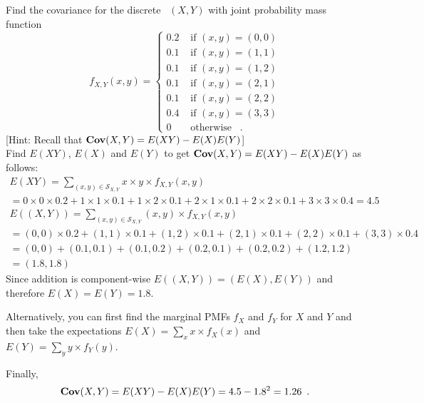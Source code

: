 \begin{ExerciseList}
\Exercise
Find the covariance for the discrete \rv~$(X,Y)$ with joint probability mass function
\[
f_{X,Y}(x,y) = 
\begin{cases}
0.2 & \text{ if } (x,y)=(0,0)\\
0.1 & \text{ if } (x,y)=(1,1)\\
0.1 & \text{ if } (x,y)=(1,2)\\
0.1 & \text{ if } (x,y)=(2,1)\\
0.1 & \text{ if } (x,y)=(2,2)\\
0.4 & \text{ if } (x,y)=(3,3)\\
0 & \text{ otherwise } \enspace .
\end{cases}
\]
[Hint: Recall that $\mathbf{Cov}(X,Y)=E(XY)-E(X)E(Y)$]
\Answer
~\\
Find $E(XY)$, $E(X)$ and $E(Y)$ to get $\mathbf{Cov}(X,Y)=E(XY)-E(X)E(Y)$ as follows:
\begin{multline*}
E(XY) = \sum_{(x,y) \in \mathcal{S}_{X,Y}} x \times y \times f_{X,Y}(x,y) \\
= 0 \times 0 \times 0.2 + 1 \times 1 \times 0.1+ 1 \times 2 \times 0.1 + 2 \times 1 \times 0.1 + 2 \times 2 \times 0.1 + 3 \times 3 \times 0.4 = 4.5
\end{multline*}
\begin{multline*}
E((X,Y)) = \sum_{(x,y) \in \mathcal{S}_{X,Y}} (x , y) \times f_{X,Y}(x,y) \\
= (0 , 0) \times 0.2 + (1 , 1) \times 0.1 + (1 , 2) \times 0.1 + (2 , 1) \times 0.1 + (2 , 2) \times 0.1 + (3 , 3) \times 0.4\\= (0,0)+(0.1,0.1)+(0.1,0.2)+(0.2,0.1)+(0.2,0.2)+(1.2,1.2) \\
= (1.8,1.8) 
\end{multline*}
Since addition is component-wise $E((X,Y))=(E(X),E(Y))$ and therefore $E(X)=E(Y)=1.8$.

Alternatively, you can first find the marginal PMFs $f_X$ and $f_Y$ for $X$ and $Y$ and then take the expectations $E(X)=\sum_x x \times f_X(x)$ and $E(Y)=\sum_y y \times f_Y(y)$.

Finally, 
\[
\mathbf{Cov}(X,Y) = E(XY)-E(X)E(Y) = 4.5 - 1.8^2 = 1.26 \enspace .
\]


\end{ExerciseList}
